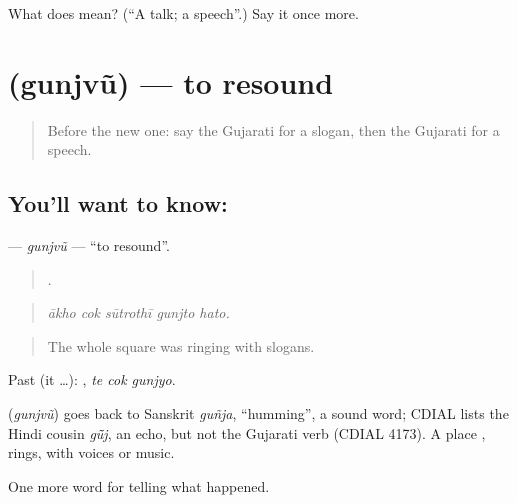 \begin{tcolorbox}[breakable,colback=teal!4,colframe=teal!35!black,title={Before you move on}]
What does  mean? (\textquotedblleft{}A talk; a speech\textquotedblright{}.) Say it once more.
\end{tcolorbox}
\section[\texorpdfstring{\gu{ગુંજવું} (gunjvũ)}{ગુંજવું (gunjvũ)}]{ (gunjvũ) — to resound}

\label{lesson:GU-C314-gunjvu}



\begin{quote}
Before the new one: say the Gujarati for a slogan, then the Gujarati for a speech.
\end{quote}

\subsection*{You'll want to know: }
\textbf{} — \emph{gunjvũ} — \textquotedblleft{}to resound\textquotedblright{}.

\begin{quote}
    .
\end{quote}

\begin{quote}
\emph{ākho cok sūtrothī gunjto hato.}
\end{quote}

\begin{quote}
The whole square was ringing with slogans.
\end{quote}

Past (it …):   , \emph{te cok gunjyo}.

\begin{cousinweb}
\textbf{} (\emph{gunjvũ}) goes back to Sanskrit \emph{guñja}, \textquotedblleft{}humming\textquotedblright{}, a sound word; CDIAL lists the Hindi cousin \emph{gū̃j}, an echo, but not the Gujarati verb (CDIAL 4173). A place \textbf{ }, rings, with voices or music.
\end{cousinweb}

\begin{grammarlens}[title={What you've built}]
One more word for telling what happened.
\end{grammarlens}

